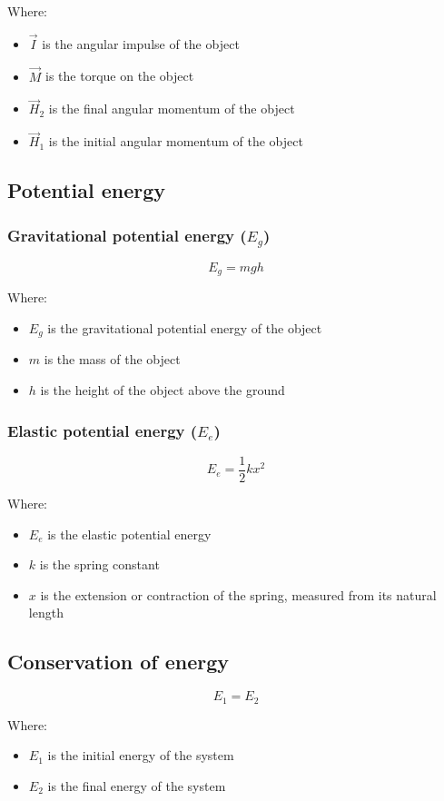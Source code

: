 \documentclass[11pt]{article}
\begin{document}
Where:
\begin{itemize}
\item \(\vec{I}\) is the angular impulse of the object
\item \(\vec{M}\) is the torque on the object
\item \(\vec{H}_2\) is the final angular momentum of the object
\item \(\vec{H}_1\) is the initial angular momentum of the object
\end{itemize}
\subsection{Potential energy}
\label{sec:org0ac0ec4}

\subsubsection{Gravitational potential energy (\(E_g\))}
\label{sec:orgad22c2e}
\[E_g = mgh\]

Where:
\begin{itemize}
\item \(E_g\) is the gravitational potential energy of the object
\item \(m\) is the mass of the object
\item \(h\) is the height of the object above the ground
\end{itemize}
\subsubsection{Elastic potential energy (\(E_e\))}
\label{sec:orgae5c641}
\[E_e = \frac{1}{2} kx^2\]

Where:
\begin{itemize}
\item \(E_e\) is the elastic potential energy
\item \(k\) is the spring constant
\item \(x\) is the extension or contraction of the spring, measured from its natural length
\end{itemize}
\subsection{Conservation of energy}
\label{sec:orgf7367cc}
\[E_1 = E_2\]

Where:
\begin{itemize}
\item \(E_1\) is the initial energy of the system
\item \(E_2\) is the final energy of the system
\end{itemize}
\end{document}
